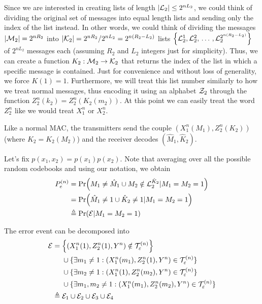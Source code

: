 
Since we are interested in creating lists of length $|\mathcal{L}_2| \leq 2^{nL_2}$, we could think of dividing the original set of messages into equal length lists and sending only the index of the list instead. In other words, we could think of dividing the messages $|\mathcal{M}_2| = 2^{nR_2}$ into $|\mathcal{K}_2| = 2^{nR_2}/2^{nL_2} = 2^{n(R_2-L_2)}$ lists $\qty{ \mathcal{L}_2^1, \mathcal{L}_2^2,\, \dots\,,\mathcal{L}_2^{2^{n(R_2-L_2)}} }$ of $2^{nL_2}$ messages each (assuming $R_2$ and $L_2$ integers just for simplicity). Thus, we can create a function $K_2: \mathcal{M}_2 \rightarrow \mathcal{K}_2$ that returns the index of the list in which a specific message is contained. Just for convenience and without loss of generality, we force $K(1)=1$. Furthermore, we will treat this list number similarly to how we treat normal messages, thus encoding it using an alphabet $\mathcal{Z}_2$ through the function $Z_2^n(k_2) = Z_2^n(K_2(m_2))$. At this point we can easily treat the word $Z_2^n$ like we would treat $X_1^n$ or $X_2^n$.

Like a normal MAC, the transmitters send the couple $(X_1^n(M_1),Z_2^n(K_2))$ (where $K_2 = K_2(M_2)$) and the receiver decodes $(\hat{M}_1,\hat{K}_2)$.

Let's fix $p(x_1,x_2) = p(x_1)p(x_2)$. Note that averaging over all the possible random codebooks and using our notation, we obtain
%
\begin{equation}
\begin{split}
 P_e^{(n)}  &= \Pr(M_1 \neq \hat{M}_1 \cup M_2 \notin \mathcal{L}_2^{\hat{K}_2} | M_1=M_2=1 )\\
&= \Pr(\hat{M}_1\neq 1 \cup \hat{K}_2 \neq 1 | M_1=M_2=1)\\
&\triangleq \Pr(\mathcal{E} | M_1=M_2=1)
\end{split}
\end{equation}

The error event can be decomposed into
%
\begin{align}
\begin{split}
\mathcal{E} ={}& \qty{ \qty(X_1^n(1),Z_2^n(1),Y^n) \notin \mathcal{T}_\varepsilon^{(n)}}\\
&\cup \{ \exists m_1\neq 1: (X_1^n(m_1),Z_2^n(1),Y^n) \in \mathcal{T}_\varepsilon^{(n)} \}\\
&\cup \{ \exists m_2\neq 1: (X_1^n(1),Z_2^n(m_2),Y^n) \in \mathcal{T}_\varepsilon^{(n)} \}\\
&\cup \{ \exists m_1,m_2\neq 1: (X_1^n(m_1),Z_2^n(m_2),Y^n) \in \mathcal{T}_\varepsilon^{(n)} \}\\
\triangleq{}& \mathcal{E}_1 \cup \mathcal{E}_2 \cup \mathcal{E}_3 \cup \mathcal{E}_4
\end{split}
\end{align}

